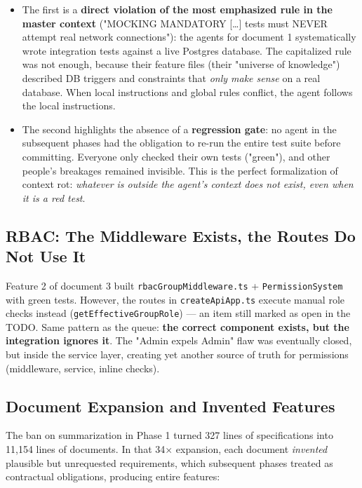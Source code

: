 \documentclass[11pt,a4paper]{article}
\newcommand{\file}[1]{\texttt{\small #1}}
\begin{document}
	\begin{itemize}[leftmargin=1.5em]
		\item The first is a \textbf{direct violation of the most emphasized rule in the master context} ("MOCKING MANDATORY [\dots] tests must NEVER attempt real network connections"): the agents for document 1 systematically wrote integration tests against a live Postgres database. The capitalized rule was not enough, because their feature files (their "universe of knowledge") described DB triggers and constraints that \emph{only make sense} on a real database. When local instructions and global rules conflict, the agent follows the local instructions.
		\item The second highlights the absence of a \textbf{regression gate}: no agent in the subsequent phases had the obligation to re-run the entire test suite before committing. Everyone only checked their own tests ("green"), and other people's breakages remained invisible. This is the perfect formalization of context rot: \emph{whatever is outside the agent's context does not exist, even when it is a red test}.
	\end{itemize}
	
	\subsection{RBAC: The Middleware Exists, the Routes Do Not Use It}
	
	Feature 2 of document 3 built \file{rbacGroupMiddleware.ts} + \file{PermissionSystem} with green tests. However, the routes in \file{createApiApp.ts} execute manual role checks instead (\file{getEffectiveGroupRole}) --- an item still marked as open in the TODO. Same pattern as the queue: \textbf{the correct component exists, but the integration ignores it}. The "Admin expels Admin" flaw was eventually closed, but inside the service layer, creating yet another source of truth for permissions (middleware, service, inline checks).
	
	\subsection{Document Expansion and Invented Features}
	
	The ban on summarization in Phase 1 turned 327 lines of specifications into 11,154 lines of documents. In that 34$\times$ expansion, each document \emph{invented} plausible but unrequested requirements, which subsequent phases treated as contractual obligations, producing entire features:
	
\end{document}

